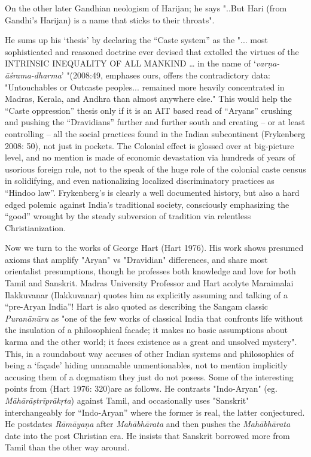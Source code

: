 On the other later Gandhian neologism of Harijan; he says "..But Hari (from Gandhi’s Harijan) is a name that sticks to their throats".

He sums up his ‘thesis’ by declaring the “Caste system” as the "... most sophisticated and reasoned doctrine ever devised that extolled the virtues of the INTRINSIC INEQUALITY OF ALL MANKIND … in the name of ‘\textit{varṇa-āśrama-dharma}’ "(2008:49, emphases ours, offers the contradictory data: "Untouchables or Outcaste peoples... remained more heavily concentrated in Madras, Kerala, and Andhra than almost anywhere else." This would help the “Caste oppression” thesis only if it is an AIT based read of “Aryans” crushing and pushing the “Dravidians” further and further south and creating – or at least controlling – all the social practices found in the Indian subcontinent (Frykenberg 2008: 50), not just in pockets. The Colonial effect is glossed over at big-picture level, and no mention is made of economic devastation via hundreds of years of usorious foreign rule, not to the speak of the huge role of the colonial caste census in solidifying, and even nationalizing localized discriminatory practices as “Hindoo law”. Frykenberg’s is clearly a well documented history, but also a hard edged polemic against India’s traditional society, consciously emphasizing the “good” wrought by the steady subversion of tradition via relentless Christianization.

Now we turn to the works of George Hart (Hart 1976). His work shows presumed axioms that amplify "Aryan" vs "Dravidian" differences, and share most orientalist presumptions, though he professes both knowledge and love for both Tamil and Sanskrit. Madras University Professor and Hart acolyte Maraimalai Ilakkuvanar (Ilakkuvanar) quotes him as explicitly assuming and talking of a “pre-Aryan India”! Hart is also quoted as describing the Sangam classic \textit{Puranānūru} as "one of the few works of classical India that confronts life without the insulation of a philosophical facade; it makes no basic assumptions about karma and the other world; it faces existence as a great and unsolved mystery". This, in a roundabout way accuses of other Indian systems and philosophies of being a ‘façade’ hiding unnamable unmentionables, not to mention implicitly accusing them of a dogmatism they just do not posess. Some of the interesting points from (Hart 1976: 320)are as follows. He contrasts "Indo-Aryan" (eg. \textit{Māhārāṣtrīprākṛta}) against Tamil, and occasionally uses "Sanskrit" interchangeably for “Indo-Aryan” where the former is real, the latter conjectured. He postdates \textit{Rāmāyaṇa} after \textit{Mahābhārata} and then pushes the \textit{Mahābhārata} date into the post Christian era. He insists that Sanskrit borrowed more from Tamil than the other way around.

